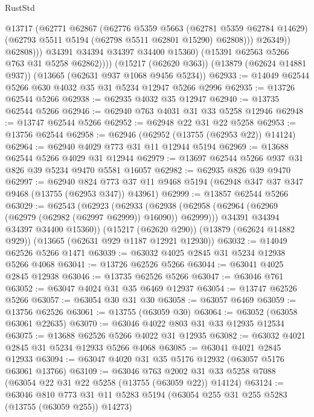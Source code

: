 \begin{lexlean}{RustStd}
\begin{coremodule}
                      @13717
                      (@62771
                        @62867
                        (@62776
                          @5359
                          @5663
                          (@62781 @5359 @62784 @14629)
                          (@62793 @5511 @5194 (@62798 @5511 @62801 @15290) @62808)))
                      @26349))
                  @62808)))
            @34391
            @34394
            @34397
            @34400
            @15360)
          (@15391 @62563 @5266 @763 @31 @5258 @62862))))
    (@15217 (@62620 @363))
    (@13879 (@62624 @14881 @937))
    (@13665 (@62631 @937 @1068 @9456 @5234))
@62933 := @14049 @62544 @5266 @630 @4032 @35 @31 @5234 @12947 @5266 @2996
@62935 := @13726 @62544 @5266
@62938 := @62935 @4032 @35 @12947
@62940 := @13735 @62544 @5266
@62946 := @62940 @763 @4031 @31 @33 @5258 @12946
@62948 := @13747 @62544 @5266
@62952 := @62948 @22 @31 @22 @5258
@62953 := @13756 @62544
@62958 := @62946 (@62952 (@13755 (@62953 @22)) @14124)
@62964 := @62940 @4029 @773 @31 @11 @12944 @5194
@62969 := @13688 @62544 @5266 @4029 @31 @12944
@62979 := @13697 @62544 @5266 @937 @31 @826 @39 @5234 @9470 @5581 @16057
@62982 := @62935 @826 @39 @9470
@62997 := @62940
    @824
    @773
    @37
    @11
    @9468
    @5194
    (@62948 @347 @37 @347 @9468 (@13755 (@62953 @347)) @43961)
@62999 := @13857 @62544 @5266
@63029 := @62543
    (@62923
      (@62933
        (@62938 (@62958 (@62964 (@62969 (@62979 (@62982 (@62997 @62999)) @16090)) @62999)))
        @34391
        @34394
        @34397
        @34400
        @15360))
    (@15217 (@62620 @290))
    (@13879 (@62624 @14882 @929))
    (@13665 (@62631 @929 @1187 @12921 @12930))
@63032 := @14049 @62526 @5266 @1471
@63039 := @63032 @4025 @2845 @31 @5234 @12938 @5266 @4068
@63041 := @13726 @62526 @5266
@63044 := @63041 @4025 @2845 @12938
@63046 := @13735 @62526 @5266
@63047 := @63046 @761
@63052 := @63047 @4024 @31 @35 @6469 @12937
@63054 := @13747 @62526 @5266
@63057 := @63054 @30 @31 @30
@63058 := @63057 @6469
@63059 := @13756 @62526
@63061 := @13755 (@63059 @30)
@63064 := @63052 (@63058 @63061 @22635)
@63070 := @63046 @4022 @803 @31 @33 @12935 @12534
@63075 := @13688 @62526 @5266 @4022 @31 @12935
@63082 := @63032 @4021 @2845 @31 @5234 @12933 @5266 @4068
@63085 := @63041 @4021 @2845 @12933
@63094 := @63047 @4020 @31 @35 @5176 @12932 (@63057 @5176 @63061 @13766)
@63109 := @63046
    @763
    @2002
    @31
    @33
    @5258
    @7088
    (@63054 @22 @31 @22 @5258 (@13755 (@63059 @22)) @14124)
@63124 := @63046
    @810
    @773
    @31
    @11
    @5283
    @5194
    (@63054 @255 @31 @255 @5283 (@13755 (@63059 @255)) @14273)

\end{coremodule}
\end{lexlean}
